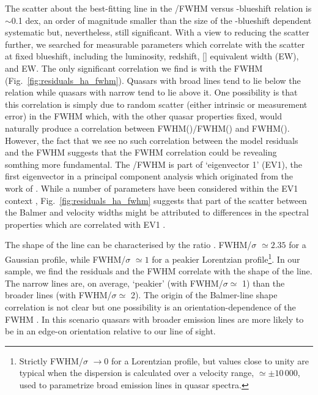 The scatter about the best-fitting line in the /\ha FWHM versus -blueshift relation is $\sim$0.1 dex, an order of magnitude smaller than the size of the -blueshift dependent systematic but, nevertheless, still significant.
With a view to reducing the scatter further, we searched for measurable parameters which correlate with the scatter at fixed  blueshift, including the luminosity, redshift, [] equivalent width (EW), and  EW.
The only significant correlation we find is with the \ha FWHM (Fig.~\ref{fig:residuals_ha_fwhm}).
Quasars with broad \ha lines tend to lie below the relation while quasars with narrow \ha tend to lie above it.
One possibility is that this correlation is simply due to random scatter (either intrinsic or measurement error) in the \ha FWHM which, with the other quasar properties fixed, would naturally produce a correlation between FWHM()/FWHM(\hans) and FWHM(\hans).
However, the fact that we see no such correlation between the model residuals and the  FWHM suggests that the \ha FWHM correlation could be revealing somthing more fundamental. 
The \hans/\hb FWHM is part of `eigenvector 1' (EV1), the first eigenvector in a principal component analysis which originated from the work of \citet{boroson92}.    
While a number of parameters have been considered within the EV1 context \citep[e.g.][]{brotherton99},
Fig.~\ref{fig:residuals_ha_fwhm} suggests that part of the scatter between the Balmer and  velocity widths might be attributed to differences in the spectral properties which are correlated with EV1 \citep{marziani13}. 

The shape of the line can be characterised by the ratio \citep[FWHM/$\sigma$, where $\sigma$ is the dispersion, derived from the second moment velocity; e.g.][]{kollatschny11,Kollatschny13}. 
FWHM/$\sigma$ $\simeq 2.35$ for a Gaussian profile, while FWHM/$\sigma$ $\simeq 1$ for a peakier Lorentzian profile\footnote{Strictly FWHM/$\sigma$ $\rightarrow 0$ for a Lorentzian profile, but values close to unity are typical when the dispersion is calculated over a velocity range, $\simeq\pm10\,000$\kms, used to parametrize broad emission lines in quasar spectra.}.
In our sample, we find the residuals and the \ha FWHM correlate with the shape of the line.   
The narrow lines are, on average, `peakier' (with FWHM/$\sigma\simeq$ 1) than the broader lines (with FWHM/$\sigma\simeq$ 2).   
The origin of the Balmer-line shape correlation is not clear but one possibility is an orientation-dependence of the \ha FWHM \citep[e.g.][]{shen14}. 
In this scenario quasars with broader emission lines are more likely to be in an edge-on orientation relative to our line of sight.  
    
